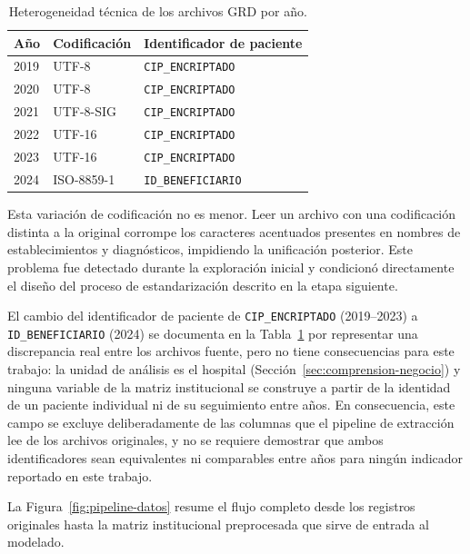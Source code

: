 \begin{table}[htbp]
\centering
\caption{Heterogeneidad técnica de los archivos GRD por año.}
\label{tab:heterogeneidad}
\begin{tabular}{lll}
\toprule
\textbf{Año} & \textbf{Codificación} & \textbf{Identificador de paciente} \\
\midrule
2019 & UTF-8        & \texttt{CIP\_ENCRIPTADO} \\
2020 & UTF-8        & \texttt{CIP\_ENCRIPTADO} \\
2021 & UTF-8-SIG    & \texttt{CIP\_ENCRIPTADO} \\
2022 & UTF-16       & \texttt{CIP\_ENCRIPTADO} \\
2023 & UTF-16       & \texttt{CIP\_ENCRIPTADO} \\
2024 & ISO-8859-1   & \texttt{ID\_BENEFICIARIO} \\
\bottomrule
\end{tabular}
\end{table}

Esta variación de codificación no es menor. Leer un archivo con una codificación
distinta a la original corrompe los caracteres acentuados presentes en nombres
de establecimientos y diagnósticos, impidiendo la unificación posterior. Este
problema fue detectado durante la exploración inicial y condicionó directamente
el diseño del proceso de estandarización descrito en la etapa siguiente.

El cambio del identificador de paciente de \texttt{CIP\_ENCRIPTADO}
(2019--2023) a \texttt{ID\_BENEFICIARIO} (2024) se documenta en la
Tabla~\ref{tab:heterogeneidad} por representar una discrepancia real entre
los archivos fuente, pero no tiene consecuencias para este trabajo: la
unidad de análisis es el hospital (Sección~\ref{sec:comprension-negocio}) y
ninguna variable de la matriz institucional se construye a partir de la
identidad de un paciente individual ni de su seguimiento entre años. En
consecuencia, este campo se excluye deliberadamente de las columnas que el
pipeline de extracción lee de los archivos originales, y no se requiere
demostrar que ambos identificadores sean equivalentes ni comparables entre
años para ningún indicador reportado en este trabajo.

La Figura~\ref{fig:pipeline-datos} resume el flujo completo desde los registros
originales hasta la matriz institucional preprocesada que sirve de entrada al
modelado.

